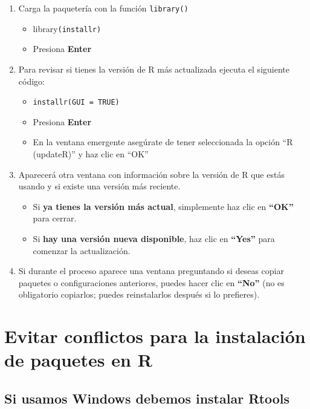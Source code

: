 \documentclass[
  spanish,
  12pt,
  letterpaper,
  DIV=11,
  numbers=noendperiod]{scrreprt}
\providecommand{\tightlist}{%
  \setlength{\itemsep}{0pt}\setlength{\parskip}{0pt}}
\begin{document}
\begin{enumerate}
\def\labelenumi{\arabic{enumi}.}
\setcounter{enumi}{2}
\item
  Carga la paquetería con la función \texttt{library()}

  \begin{itemize}
  \tightlist
  \item
    library\texttt{(installr)}
  \item
    Presiona \textbf{Enter}
  \end{itemize}
\item
  Para revisar si tienes la versión de R más actualizada ejecuta el
  siguiente código:

  \begin{itemize}
  \tightlist
  \item
    \texttt{installr(GUI\ =\ TRUE)}
  \item
    Presiona \textbf{Enter}
  \item
    En la ventana emergente asegúrate de tener seleccionada la opción
    ``R (updateR)'' y haz clic en ``OK''
  \end{itemize}
\item
  Aparecerá otra ventana con información sobre la versión de R que estás
  usando y si existe una versión más reciente.

  \begin{itemize}
  \tightlist
  \item
    Si \textbf{ya tienes la versión más actual}, simplemente haz clic en
    \textbf{``OK''} para cerrar.
  \item
    Si \textbf{hay una versión nueva disponible}, haz clic en
    \textbf{``Yes''} para comenzar la actualización.
  \end{itemize}
\item
  Si durante el proceso aparece una ventana preguntando si deseas copiar
  paquetes o configuraciones anteriores, puedes hacer clic en
  \textbf{``No''} (no es obligatorio copiarlos; puedes reinstalarlos
  después si lo prefieres).
\end{enumerate}

\section{Evitar conflictos para la instalación de paquetes en
R}\label{evitar-conflictos-para-la-instalaciuxf3n-de-paquetes-en-r}

\subsection{Si usamos Windows debemos instalar
Rtools}\label{si-usamos-windows-debemos-instalar-rtools}
\end{document}
